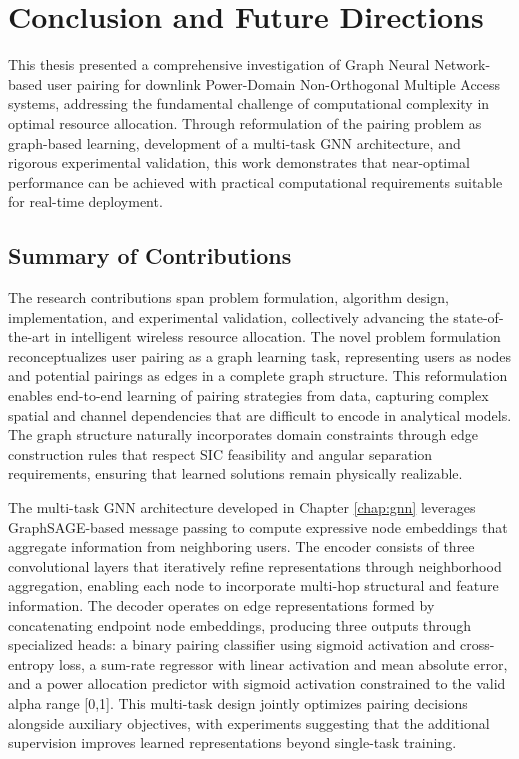 \chapter{Conclusion and Future Directions}
\label{chap:conclusion}

This thesis presented a comprehensive investigation of Graph Neural Network-based user pairing for downlink Power-Domain Non-Orthogonal Multiple Access systems, addressing the fundamental challenge of computational complexity in optimal resource allocation. Through reformulation of the pairing problem as graph-based learning, development of a multi-task GNN architecture, and rigorous experimental validation, this work demonstrates that near-optimal performance can be achieved with practical computational requirements suitable for real-time deployment.

\section{Summary of Contributions}

The research contributions span problem formulation, algorithm design, implementation, and experimental validation, collectively advancing the state-of-the-art in intelligent wireless resource allocation. The novel problem formulation reconceptualizes user pairing as a graph learning task, representing users as nodes and potential pairings as edges in a complete graph structure. This reformulation enables end-to-end learning of pairing strategies from data, capturing complex spatial and channel dependencies that are difficult to encode in analytical models. The graph structure naturally incorporates domain constraints through edge construction rules that respect SIC feasibility and angular separation requirements, ensuring that learned solutions remain physically realizable.

The multi-task GNN architecture developed in Chapter \ref{chap:gnn} leverages GraphSAGE-based message passing to compute expressive node embeddings that aggregate information from neighboring users. The encoder consists of three convolutional layers that iteratively refine representations through neighborhood aggregation, enabling each node to incorporate multi-hop structural and feature information. The decoder operates on edge representations formed by concatenating endpoint node embeddings, producing three outputs through specialized heads: a binary pairing classifier using sigmoid activation and cross-entropy loss, a sum-rate regressor with linear activation and mean absolute error, and a power allocation predictor with sigmoid activation constrained to the valid alpha range [0,1]. This multi-task design jointly optimizes pairing decisions alongside auxiliary objectives, with experiments suggesting that the additional supervision improves learned representations beyond single-task training.

